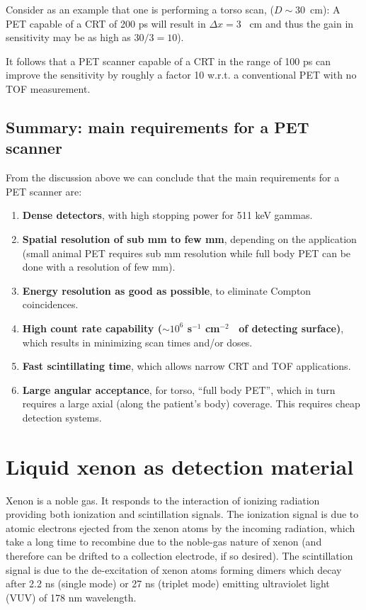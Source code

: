 \documentclass[review]{elsarticle}
\begin{document}
Consider as an example that one is performing a torso scan, ($D \sim 30$~cm): A PET capable of a CRT of 200 ps will result in $\Delta x = 3$~ cm and thus the gain in sensitivity may be as high as $30/3 = 10$). 
  
It follows that a PET scanner capable of a CRT in the range of 100 ps can improve the sensitivity by roughly a factor 10 w.r.t. a conventional PET with no TOF measurement. 


\subsection*{Summary: main requirements for a PET scanner}

From the discussion above we can conclude that the 
main requirements for a PET scanner are: 

\begin{enumerate}
\item {\bf Dense detectors}, with high stopping power for 511 keV gammas.
\item {\bf Spatial resolution of sub mm to few mm}, depending on the application (small animal PET requires sub mm resolution while full body PET can be done with a resolution of few mm).
\item {\bf Energy resolution as good as possible}, to eliminate Compton coincidences.
\item {\bf High count rate capability ($\sim10^6$ s$^{-1}$ cm$^{-2}$~ of detecting surface)}, which results in minimizing scan times and/or doses.
\item {\bf Fast scintillating time}, which allows narrow CRT and TOF applications. 
\item {\bf Large angular acceptance}, for torso, ``full body PET'', which in turn requires a large axial (along the patient's body) coverage. This requires cheap detection systems. 
\end{enumerate}


\section{Liquid xenon as detection material}\label{sec.LXe}

%

Xenon is a noble gas. It responds to the interaction of ionizing radiation providing both ionization and scintillation signals. The ionization signal is due to atomic electrons ejected from the xenon atoms by the incoming radiation, which take a long time to recombine due to the noble-gas nature of xenon (and therefore can be drifted to a collection electrode, if so desired). The scintillation signal is due to the de-excitation of xenon atoms forming dimers which decay after 2.2 ns (single mode) or 27 ns (triplet mode) emitting ultraviolet light (VUV) of 178 nm wavelength.
\end{document}
